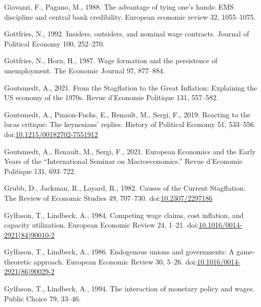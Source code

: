 \documentclass[
  12pt,
  onecolumn]{article}
\newlength{\cslhangindent}
\newlength{\cslentryspacingunit} %
\newenvironment{CSLReferences}[2] %
 {%
  \setlength{\parindent}{0pt}
  \ifodd #1
  \let\oldpar\par
  \def\par{\hangindent=\cslhangindent\oldpar}
  \fi
  \setlength{\parskip}{#2\cslentryspacingunit}
 }%
 {}
\begin{document}
\begin{CSLReferences}{1}{0}
\leavevmode{}%
Giavazzi, F., Pagano, M., 1988. The advantage of tying one's hands:
{EMS} discipline and central bank credibility. European economic review
32, 1055--1075.

\leavevmode{}%
Gottfries, N., 1992. Insiders, outsiders, and nominal wage contracts.
Journal of Political Economy 100, 252--270.

\leavevmode{}%
Gottfries, N., Horn, H., 1987. Wage formation and the persistence of
unemployment. The Economic Journal 97, 877--884.

\leavevmode{}%
Goutsmedt, A., 2021. From the {Stagflation} to the {Great Inflation}:
{Explaining} the {US} economy of the 1970s. Revue d'Economie Politique
131, 557--582.

\leavevmode{}%
Goutsmedt, A., Pinzon-Fuchs, E., Renault, M., Sergi, F., 2019. Reacting
to the lucas critique: {The} keynesians' replies. History of Political
Economy 51, 533--556.
doi:\href{https://doi.org/10.1215/00182702-7551912}{10.1215/00182702-7551912}

\leavevmode{}%
Goutsmedt, A., Renault, M., Sergi, F., 2021. European {Economics} and
the {Early Years} of the {``{International Seminar} on
{Macroeconomics}.''} Revue d'Economie Politique 131, 693--722.

\leavevmode{}%
Grubb, D., Jackman, R., Layard, R., 1982. Causes of the {Current
Stagflation}. The Review of Economic Studies 49, 707--730.
doi:\href{https://doi.org/10.2307/2297186}{10.2307/2297186}

\leavevmode{}%
Gylfason, T., Lindbeck, A., 1984. Competing wage claims, cost inflation,
and capacity utilization. European Economic Review 24, 1--21.
doi:\href{https://doi.org/10.1016/0014-2921(84)90010-2}{10.1016/0014-2921(84)90010-2}

\leavevmode{}%
Gylfason, T., Lindbeck, A., 1986. Endogenous unions and governments: {A}
game-theoretic approach. European Economic Review 30, 5--26.
doi:\href{https://doi.org/10.1016/0014-2921(86)90029-2}{10.1016/0014-2921(86)90029-2}

\leavevmode{}%
Gylfason, T., Lindbeck, A., 1994. The interaction of monetary policy and
wages. Public Choice 79, 33--46.


\end{CSLReferences}
\end{document}
